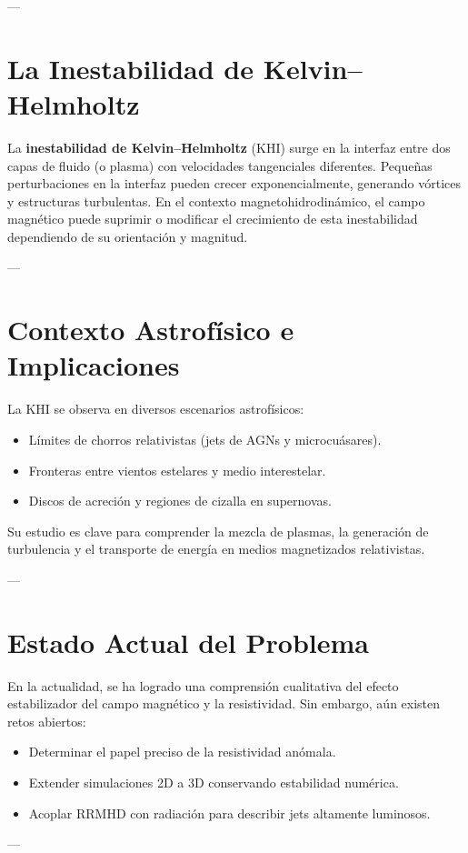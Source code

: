 ---

\section{La Inestabilidad de Kelvin–Helmholtz}
La \textbf{inestabilidad de Kelvin–Helmholtz} (KHI) surge en la interfaz entre dos capas de fluido (o plasma) con velocidades tangenciales diferentes.  
Pequeñas perturbaciones en la interfaz pueden crecer exponencialmente, generando vórtices y estructuras turbulentas.  
En el contexto magnetohidrodinámico, el campo magnético puede suprimir o modificar el crecimiento de esta inestabilidad dependiendo de su orientación y magnitud.

---

\section{Contexto Astrofísico e Implicaciones}
La KHI se observa en diversos escenarios astrofísicos:
\begin{itemize}
    \item Límites de chorros relativistas (jets de AGNs y microcuásares).
    \item Fronteras entre vientos estelares y medio interestelar.
    \item Discos de acreción y regiones de cizalla en supernovas.
\end{itemize}
Su estudio es clave para comprender la mezcla de plasmas, la generación de turbulencia y el transporte de energía en medios magnetizados relativistas.

---

\section{Estado Actual del Problema}
En la actualidad, se ha logrado una comprensión cualitativa del efecto estabilizador del campo magnético y la resistividad.  
Sin embargo, aún existen retos abiertos:
\begin{itemize}
    \item Determinar el papel preciso de la resistividad anómala.
    \item Extender simulaciones 2D a 3D conservando estabilidad numérica.
    \item Acoplar RRMHD con radiación para describir jets altamente luminosos.
\end{itemize}

---

